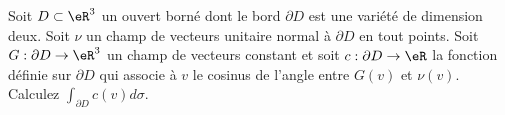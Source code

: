 
\begin{exercice}\label{exoVariete0014}

Soit $D \subset \eR^3$ un ouvert borné dont le bord $\partial D$ est une 
variété de dimension deux. Soit $\nu$ un champ de vecteurs unitaire 
normal à $\partial D$ en tout points. Soit $G: \partial D \rightarrow 
\eR^3$ un champ de vecteurs constant et soit $c: \partial D \rightarrow  \eR$ 
la fonction définie sur $\partial D$ qui associe à $v$ le cosinus de 
l'angle entre $G(v)$ et $\nu(v)$. Calculez $\int_{\partial D} c(v) d \sigma 
$.

\end{exercice}
